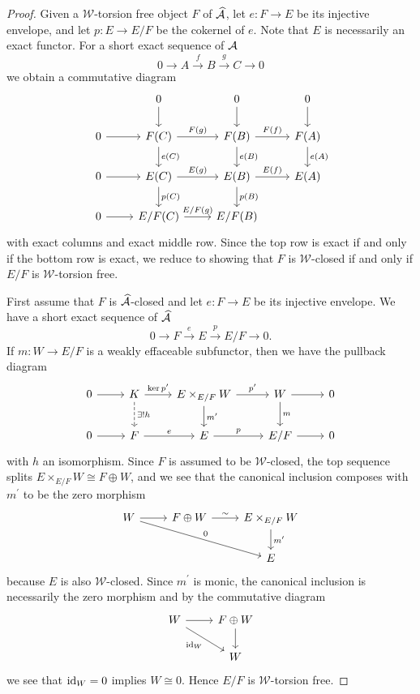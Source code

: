 \documentclass[reqno, 12pt]{amsart}
\begin{document}
\begin{proof}
  Given a $\mathcal{W}$-torsion free object $F$ of $\widehat{\mathcal{A}}$, let $e \colon F \to E$ be its injective envelope, and let $p \colon E \to E/F$ be the cokernel of $e$.
  Note that $E$ is necessarily an exact functor.
  For a short exact sequence of $\mathcal{A}$
  $$0 \to A \overset{f}\to B \overset{g}\to C \to 0$$
  we obtain a commutative diagram
  $$\begin{tikzcd}
    & 0\arrow{d} & 0\arrow{d} & 0\arrow{d}\\
    0 \arrow{r} & F(C) \arrow{r}{F(g)}\arrow{d}{e(C)} & F(B) \arrow{r}{F(f)}\arrow{d}{e(B)} & F(A) \arrow{d}{e(A)}\\
    0 \arrow{r} & E(C)\arrow{d}{p(C)}\arrow{r}{E(g)} & E(B)\arrow{d}{p(B)}\arrow{r}{E(f)} & E(A)\\
    0 \arrow{r} & E/F(C)\arrow{r}{E/F(g)} & E/F(B)
  \end{tikzcd}$$
  with exact columns and exact middle row.
  Since the top row is exact if and only if the bottom row is exact, we reduce to showing that $F$ is $\mathcal{W}$-closed if and only if $E/F$ is $\mathcal{W}$-torsion free.
  
  First assume that $F$ is $\widehat{\mathcal{A}}$-closed and let $e \colon F \to E$ be its injective envelope.
  We have a short exact sequence of $\widehat{\mathcal{A}}$
  $$0 \to F \overset{e}\to E \overset{p}\to E/F \to 0.$$
  If $m \colon W \to E/F$ is a weakly effaceable subfunctor, then we have the pullback diagram
  $$\begin{tikzcd}
    0 \arrow{r} & K \arrow[dashed]{d}{\exists !h}\arrow{r}{\op{ker} p^\prime}& E \times_{E/F} W \arrow{d}{m^\prime}\arrow{r}{p^\prime} & W\arrow{d}{m}\arrow{r} & 0\\
    0 \arrow{r} & F \arrow{r}{e} & E \arrow{r}{p} & E/F \arrow{r} & 0
  \end{tikzcd}$$
  with $h$ an isomorphism.
  Since $F$ is assumed to be $\mathcal{W}$-closed, the top sequence splits $E \times_{E/F} W \cong F \oplus W$, and we see that the canonical inclusion composes with $m^\prime$ to be the zero morphism
  $$\begin{tikzcd}
    W \arrow{rrd}{0}\arrow{r} & F \oplus W \arrow{r}{\sim} & E \times_{E/F} W \arrow{d}{m^\prime}\\
    & & E
  \end{tikzcd}$$
  because $E$ is also $\mathcal{W}$-closed.
  Since $m^\prime$ is monic, the canonical inclusion is necessarily the zero morphism and by the commutative diagram
  $$\begin{tikzcd}
    W \arrow{r}\arrow[swap]{rd}{\id_W} & F \oplus W \arrow{d}\\
    & W
  \end{tikzcd}$$
  we see that $\operatorname{id}_W = 0$ implies $W \cong 0$.
  Hence $E/F$ is $\mathcal{W}$-torsion free.


\end{proof}
\end{document}
